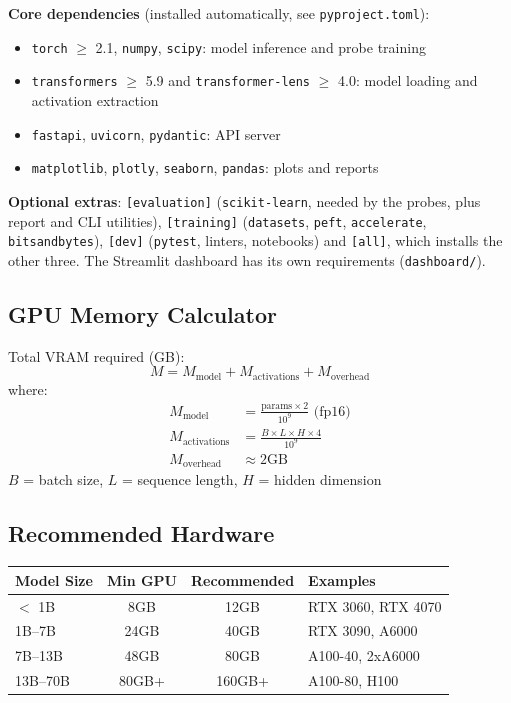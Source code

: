 \documentclass[11pt,letterpaper]{article}
\let\origsubsection\subsection
\renewcommand{\subsection}{\needspace{8\baselineskip}\origsubsection}}
\begin{document}
\begin{infobox}[Dependencies]
\textbf{Core dependencies} (installed automatically, see \texttt{pyproject.toml}):
\begin{itemize}[nosep]
  \item \texttt{torch} $\geq$ 2.1, \texttt{numpy}, \texttt{scipy}: model inference and probe training
  \item \texttt{transformers} $\geq$ 5.9 and \texttt{transformer-lens} $\geq$ 4.0: model loading and activation extraction
  \item \texttt{fastapi}, \texttt{uvicorn}, \texttt{pydantic}: API server
  \item \texttt{matplotlib}, \texttt{plotly}, \texttt{seaborn}, \texttt{pandas}: plots and reports
\end{itemize}
\textbf{Optional extras}: \texttt{[evaluation]} (\texttt{scikit-learn}, needed by the probes, plus report and CLI utilities), \texttt{[training]} (\texttt{datasets}, \texttt{peft}, \texttt{accelerate}, \texttt{bitsandbytes}), \texttt{[dev]} (\texttt{pytest}, linters, notebooks) and \texttt{[all]}, which installs the other three. The Streamlit dashboard has its own requirements (\texttt{dashboard/}).
\end{infobox}

\subsection{GPU Memory Calculator}

\begin{mathbox}
Total VRAM required (GB):
\[
M = M_{\text{model}} + M_{\text{activations}} + M_{\text{overhead}}
\]
where:
\begin{align*}
M_{\text{model}} &= \frac{\text{params} \times 2}{10^9} \text{ (fp16)} \\
M_{\text{activations}} &= \frac{B \times L \times H \times 4}{10^9} \\
M_{\text{overhead}} &\approx 2\text{GB}
\end{align*}
$B$ = batch size, $L$ = sequence length, $H$ = hidden dimension
\end{mathbox}

\subsection{Recommended Hardware}

\begin{center}
\begin{tabular}{lccl}
\toprule
\textbf{Model Size} & \textbf{Min GPU} & \textbf{Recommended} & \textbf{Examples} \\
\midrule
\rowcolor{backgroundgray} $<$ 1B & 8GB & 12GB & RTX 3060, RTX 4070 \\
1B--7B & 24GB & 40GB & RTX 3090, A6000 \\
\rowcolor{backgroundgray} 7B--13B & 48GB & 80GB & A100-40, 2xA6000 \\
13B--70B & 80GB+ & 160GB+ & A100-80, H100 \\
\bottomrule
\end{tabular}
\end{center}
\end{document}
